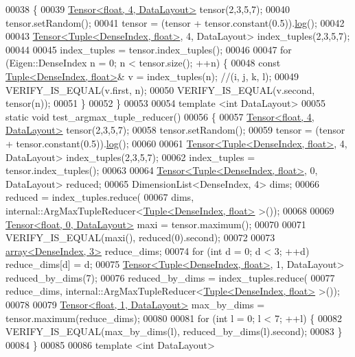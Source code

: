 \begin{DoxyCode}
00038 \{
00039   \hyperlink{class_eigen_1_1_tensor}{Tensor<float, 4, DataLayout>} tensor(2,3,5,7);
00040   tensor.setRandom();
00041   tensor = (tensor + tensor.constant(0.5)).\hyperlink{structlog}{log}();
00042 
00043   \hyperlink{class_eigen_1_1_tensor}{Tensor<Tuple<DenseIndex, float>}, 4, DataLayout> index\_tuples(2,3,5,7);
00044 
00045   index\_tuples = tensor.index\_tuples();
00046 
00047   \textcolor{keywordflow}{for} (Eigen::DenseIndex n = 0; n < tensor.size(); ++n) \{
00048     \textcolor{keyword}{const} \hyperlink{struct_eigen_1_1_tuple}{Tuple<DenseIndex, float>}& v = index\_tuples(n); \textcolor{comment}{//(i, j, k, l);}
00049     VERIFY\_IS\_EQUAL(v.first, n);
00050     VERIFY\_IS\_EQUAL(v.second, tensor(n));
00051   \}
00052 \}
00053 
00054 \textcolor{keyword}{template} <\textcolor{keywordtype}{int} DataLayout>
00055 \textcolor{keyword}{static} \textcolor{keywordtype}{void} test\_argmax\_tuple\_reducer()
00056 \{
00057   \hyperlink{class_eigen_1_1_tensor}{Tensor<float, 4, DataLayout>} tensor(2,3,5,7);
00058   tensor.setRandom();
00059   tensor = (tensor + tensor.constant(0.5)).\hyperlink{structlog}{log}();
00060 
00061   \hyperlink{class_eigen_1_1_tensor}{Tensor<Tuple<DenseIndex, float>}, 4, DataLayout> index\_tuples(2,3,5,7);
00062   index\_tuples = tensor.index\_tuples();
00063 
00064   \hyperlink{class_eigen_1_1_tensor}{Tensor<Tuple<DenseIndex, float>}, 0, DataLayout> reduced;
00065   DimensionList<DenseIndex, 4> dims;
00066   reduced = index\_tuples.reduce(
00067       dims, internal::ArgMaxTupleReducer<\hyperlink{struct_eigen_1_1_tuple}{Tuple<DenseIndex, float>} >());
00068 
00069   \hyperlink{class_eigen_1_1_tensor}{Tensor<float, 0, DataLayout>} maxi = tensor.maximum();
00070 
00071   VERIFY\_IS\_EQUAL(maxi(), reduced(0).second);
00072 
00073   \hyperlink{class_eigen_1_1array}{array<DenseIndex, 3>} reduce\_dims;
00074   \textcolor{keywordflow}{for} (\textcolor{keywordtype}{int} d = 0; d < 3; ++d) reduce\_dims[d] = d;
00075   \hyperlink{class_eigen_1_1_tensor}{Tensor<Tuple<DenseIndex, float>}, 1, DataLayout> reduced\_by\_dims(7);
00076   reduced\_by\_dims = index\_tuples.reduce(
00077       reduce\_dims, internal::ArgMaxTupleReducer<\hyperlink{struct_eigen_1_1_tuple}{Tuple<DenseIndex, float>} >());
00078 
00079   \hyperlink{class_eigen_1_1_tensor}{Tensor<float, 1, DataLayout>} max\_by\_dims = tensor.maximum(reduce\_dims);
00080 
00081   \textcolor{keywordflow}{for} (\textcolor{keywordtype}{int} l = 0; l < 7; ++l) \{
00082     VERIFY\_IS\_EQUAL(max\_by\_dims(l), reduced\_by\_dims(l).second);
00083   \}
00084 \}
00085 
00086 \textcolor{keyword}{template} <\textcolor{keywordtype}{int} DataLayout>

\end{DoxyCode}
